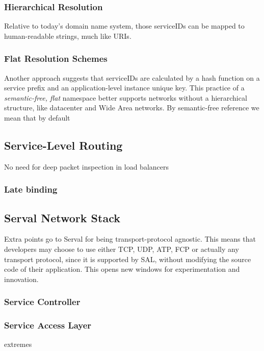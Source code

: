 \subsubsection{Hierarchical Resolution}
Relative to today's domain name system, those serviceIDs can be mapped to human-readable strings, much like URIs.

\subsubsection{Flat Resolution Schemes}
Another approach suggests that serviceIDs are calculated by a hash function on a service prefix and an application-level instance unique key.
This practice of a \emph{semantic-free, flat} namespace better supports networks without a hierarchical structure, like datacenter and Wide Area networks.
By semantic-free\cite{Walfisha2004} reference we mean that by default 

\subsection{Service-Level Routing} 
No need for deep packet inspection in load balancers


\subsubsection{Late binding}

\subsection{Serval Network Stack}
Extra points go to Serval for being transport-protocol agnostic.
This means that developers may choose to use either TCP, UDP, ATP, FCP or actually any transport protocol, since it is supported by SAL, without modifying the source code of their application.
This opens new windows for experimentation and innovation.

\subsubsection{Service Controller}

\subsubsection{Service Access Layer}
extremes
